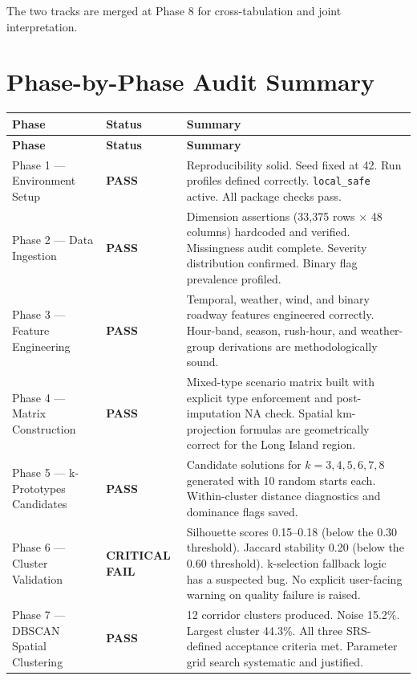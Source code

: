 \documentclass[11pt]{article}
\newcommand{\pass}{\textcolor{passgreen}{\textbf{PASS}}}
\newcommand{\fail}{\textcolor{failred}{\textbf{CRITICAL FAIL}}}
\begin{document}
The two tracks are merged at Phase 8 for cross-tabulation and joint interpretation.

\section{Phase-by-Phase Audit Summary}

\begin{longtable}{|p{3.2cm}|p{2cm}|p{8.5cm}|}
\hline
\textbf{Phase} & \textbf{Status} & \textbf{Summary} \\
\hline
\endfirsthead
\hline
\textbf{Phase} & \textbf{Status} & \textbf{Summary} \\
\hline
\endhead
Phase 1 --- Environment Setup & \pass & Reproducibility solid. Seed fixed at 42.
Run profiles defined correctly. \texttt{local\_safe} active. All package checks
pass. \\ \hline
Phase 2 --- Data Ingestion & \pass & Dimension assertions (33{,}375 rows
$\times$ 48 columns) hardcoded and verified. Missingness audit complete. Severity
distribution confirmed. Binary flag prevalence profiled. \\ \hline
Phase 3 --- Feature Engineering & \pass & Temporal, weather, wind, and binary
roadway features engineered correctly. Hour-band, season, rush-hour, and
weather-group derivations are methodologically sound. \\ \hline
Phase 4 --- Matrix Construction & \pass & Mixed-type scenario matrix built with
explicit type enforcement and post-imputation NA check. Spatial km-projection
formulas are geometrically correct for the Long Island region. \\ \hline
Phase 5 --- k-Prototypes Candidates & \pass & Candidate solutions for
$k = 3, 4, 5, 6, 7, 8$ generated with 10 random starts each. Within-cluster
distance diagnostics and dominance flags saved. \\ \hline
Phase 6 --- Cluster Validation & \fail & Silhouette scores 0.15--0.18 (below the
0.30 threshold). Jaccard stability 0.20 (below the 0.60 threshold). k-selection
fallback logic has a suspected bug. No explicit user-facing warning on quality
failure is raised. \\ \hline
Phase 7 --- DBSCAN Spatial Clustering & \pass & 12 corridor clusters produced.
Noise 15.2\%. Largest cluster 44.3\%. All three SRS-defined acceptance criteria
met. Parameter grid search systematic and justified. \\ \hline

\end{longtable}
\end{document}
